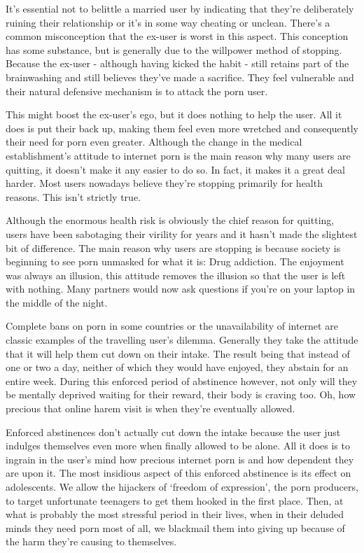 \documentclass[
]{book}
\begin{document}
It's essential not to belittle a married user by indicating that they're deliberately ruining their relationship or it's in some way cheating or unclean. There's a common misconception that the ex-user is worst in this aspect. This conception has some substance, but is generally due to the willpower method of stopping. Because the ex-user - although having kicked the habit - still retains part of the brainwashing and still believes they've made a sacrifice. They feel vulnerable and their natural defensive mechanism is to attack the porn user.

This might boost the ex-user's ego, but it does nothing to help the user. All it does is put their back up, making them feel even more wretched and consequently their need for porn even greater. Although the change in the medical establishment's attitude to internet porn is the main reason why many users are quitting, it doesn't make it any easier to do so. In fact, it makes it a great deal harder. Most users nowadays believe they're stopping primarily for health reasons. This isn't strictly true.

Although the enormous health risk is obviously the chief reason for quitting, users have been sabotaging their virility for years and it hasn't made the slightest bit of difference. The main reason why users are stopping is because society is beginning to see porn unmasked for what it is: Drug addiction. The enjoyment was always an illusion, this attitude removes the illusion so that the user is left with nothing. Many partners would now ask questions if you're on your laptop in the middle of the night.

Complete bans on porn in some countries or the unavailability of internet are classic examples of the travelling user's dilemma. Generally they take the attitude that it will help them cut down on their intake. The result being that instead of one or two a day, neither of which they would have enjoyed, they abstain for an entire week. During this enforced period of abstinence however, not only will they be mentally deprived waiting for their reward, their body is craving too. Oh, how precious that online harem visit is when they're eventually allowed.

Enforced abstinences don't actually cut down the intake because the user just indulges themselves even more when finally allowed to be alone. All it does is to ingrain in the user's mind how precious internet porn is and how dependent they are upon it. The most insidious aspect of this enforced abstinence is its effect on adolescents. We allow the hijackers of `freedom of expression', the porn producers, to target unfortunate teenagers to get them hooked in the first place. Then, at what is probably the most stressful period in their lives, when in their deluded minds they need porn most of all, we blackmail them into giving up because of the harm they're causing to themselves.
\end{document}
